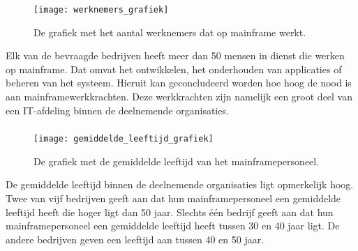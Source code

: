  \subsubsection{}
\label{sec:Wat is het aantal van werknemers die werk leveren dat te maken heeft met het ontwikkelen, onderhouden of beheren van een mainframe?}

 \begin{figure}[h]
    \centering
    \texttt{[image: werknemers\_grafiek]}
    \caption{De grafiek met het aantal werknemers dat op mainframe werkt.}
\end{figure}

Elk van de bevraagde bedrijven heeft meer dan 50 mensen in dienst die werken op mainframe. Dat omvat het ontwikkelen, het onderhouden van applicaties of beheren van het systeem. Hieruit kan geconcludeerd worden hoe hoog de nood is aan mainframewerkkrachten. Deze werkkrachten zijn namelijk een groot deel van een IT-afdeling binnen de deelnemende organisaties.

\newpage

 \subsubsection{}
\label{sec:Wat is de gemiddelde leeftijd van het mainframepersoneel?}

\begin{figure}[h]
    \centering
    \texttt{[image: gemiddelde\_leeftijd\_grafiek]}
    \caption{De grafiek met de gemiddelde leeftijd van het mainframepersoneel.}
\end{figure}


De gemiddelde leeftijd binnen de deelnemende organisaties ligt opmerkelijk hoog. Twee van vijf bedrijven geeft aan dat hun mainframepersoneel een gemiddelde leeftijd heeft die hoger ligt dan 50 jaar. Slechts één bedrijf geeft aan dat hun mainframepersoneel een gemiddelde leeftijd heeft tussen 30 en 40 jaar ligt. De andere bedrijven geven een leeftijd aan tussen 40 en 50 jaar. 

\newpage 

  \subsubsection{}
 \label{sec:Zijn er signalen die aangeven of er een tekort is aan nieuwe mainframe-experten?}
 
